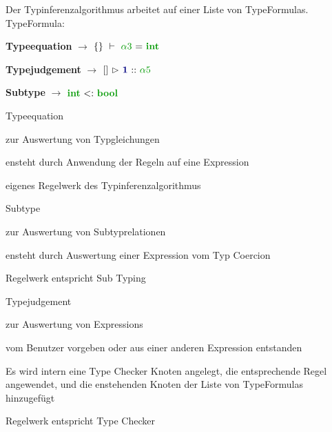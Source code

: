 { 
    \begin{itemgroup}{Der Typinferenzalgorithmus arbeitet auf einer Liste von TypeFormulas. \\[10mm] 
	TypeFormula:\\[-4mm]}
    
    \item \textbf{Typeequation} 	$\to$	$\SeenTypes{}\ \vdash\ \TypeEquationTypeInference
	{\TypeTypeVariable{\alpha3}} {\TypeIntegerType} $ 
    \item \textbf{Typejudgement} $\to$  	 $\TypeJudgement {\TypeEnvironment{}} {\ExprConstant{1}}
    	{\TypeTypeVariable{\alpha5}} $ 
    \item \textbf{Subtype}	$\to$	$\TypeSubType {\TypeIntegerType} {\TypeBooleanType} $  \\[-3mm]

    \end{itemgroup}
}

{ 
    \begin{itemgroup}{Typeequation}
     
	\item zur Auswertung von Typgleichungen
	\item ensteht durch Anwendung der Regeln auf eine Expression 
	\item eigenes Regelwerk des Typinferenzalgorithmus  \\
    \end{itemgroup}
    \begin{itemgroup}{Subtype}	
	\item zur Auswertung von Subtyprelationen
	\item ensteht durch Auswertung einer Expression vom Typ Coercion
	\item Regelwerk entspricht Sub Typing
     \end{itemgroup}
}

{ 
	\begin{itemgroup}{Typejudgement}
	\item zur Auswertung von Expressions 
	\item vom Benutzer vorgeben oder aus einer anderen Expression entstanden
	\item Es wird intern eine Type Checker Knoten angelegt, die entsprechende Regel angewendet,
	und die enstehenden Knoten der Liste von TypeFormulas hinzugefügt
	\item Regelwerk entspricht Type Checker
     \end{itemgroup}
}